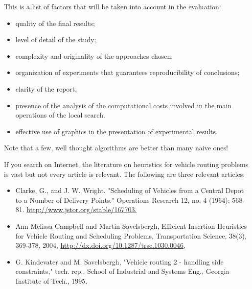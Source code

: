 \begin{remarks} 


\item This is a list of factors that will be taken into account in the
evaluation:


\begin{itemize} 
\item quality of the final results;
\item level of detail of the study;
\item complexity and originality of the approaches chosen;

\item organization of experiments that guarantees reproducibility of
  conclusions;
\item clarity of the report;
\item presence of the analysis of the computational costs involved in
  the main operations of the local search.

\item effective use of graphics in the presentation of experimental results.
\end{itemize}


\item 
Note that a few, well thought algorithms are better than many naive ones!


\color{red}

\item If you search on Internet, the literature on heuristics for
  vehicle routing problems is vast but not every article is
  relevant. The following are three relevant articles:


\begin{itemize}


\item Clarke, G., and J. W. Wright. "Scheduling of Vehicles from a
  Central Depot to a Number of Delivery Points." Operations Research 12,
  no. 4 (1964): 568-81. \url{http://www.jstor.org/stable/167703.}

\item Ann Melissa Campbell and Martin Savelsbergh, Efficient Insertion
  Heuristics for Vehicle Routing and Scheduling Problems, Transportation Science,
38(3), 369-378, 2004, \url{http://dx.doi.org/10.1287/trsc.1030.0046},

  
\item G. Kindevater and M. Savelsbergh, "Vehicle routing 2 - handling
  side constraints," tech. rep., School of Industrial and Systems Eng.,
  Georgia Institute of Tech., 1995.

  
\end{itemize}

\end{remarks}



